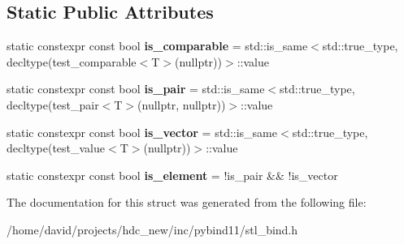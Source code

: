\subsection*{Static Public Attributes}
\begin{DoxyCompactItemize}
\item 
static constexpr const bool {\bfseries is\+\_\+comparable} = std\+::is\+\_\+same$<$std\+::true\+\_\+type, decltype(test\+\_\+comparable$<$T$>$(nullptr))$>$\+::value\hypertarget{structcontainer__traits_ab2461388054411125b0719d7faf82978}{}\label{structcontainer__traits_ab2461388054411125b0719d7faf82978}

\item 
static constexpr const bool {\bfseries is\+\_\+pair} = std\+::is\+\_\+same$<$std\+::true\+\_\+type, decltype(test\+\_\+pair$<$T$>$(nullptr, nullptr))$>$\+::value\hypertarget{structcontainer__traits_ae17fa45f5c1984602e162ba0d9ee7f72}{}\label{structcontainer__traits_ae17fa45f5c1984602e162ba0d9ee7f72}

\item 
static constexpr const bool {\bfseries is\+\_\+vector} = std\+::is\+\_\+same$<$std\+::true\+\_\+type, decltype(test\+\_\+value$<$T$>$(nullptr))$>$\+::value\hypertarget{structcontainer__traits_a766d4e152eb677e230229880dee2dbb2}{}\label{structcontainer__traits_a766d4e152eb677e230229880dee2dbb2}

\item 
static constexpr const bool {\bfseries is\+\_\+element} = !is\+\_\+pair \&\& !is\+\_\+vector\hypertarget{structcontainer__traits_ae5c7a42dfa2b713aae741ed37d6c192b}{}\label{structcontainer__traits_ae5c7a42dfa2b713aae741ed37d6c192b}

\end{DoxyCompactItemize}


The documentation for this struct was generated from the following file\+:\begin{DoxyCompactItemize}
\item 
/home/david/projects/hdc\+\_\+new/inc/pybind11/stl\+\_\+bind.\+h\end{DoxyCompactItemize}
